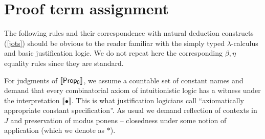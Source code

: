 \section{Proof term assignment}
\label{basicpras}
The following rules and their correspondence with natural deduction  constructs (\ref{jots}) should be obvious to the reader familiar with the simply typed  $\lambda$-calculus and basic justification logic.
We do not repeat here the corresponding $\beta, \eta$ equality rules since they are standard.
    
    For  judgments of ${\sf \llbracket Prop_0\rrbracket}$, we assume a countable set of constant names and demand that every combinatorial
    axiom of intuitionistic logic has  a witness under the interpretation 
    $\llbracket\bullet\rrbracket$. This is what justification logicians call ``axiomatically appropriate constant specification''.
    As usual we demand reflection of contexts in $J$
    and preservation of modus ponens -- closedness under some notion of application (which we denote as $*$).
    
    
